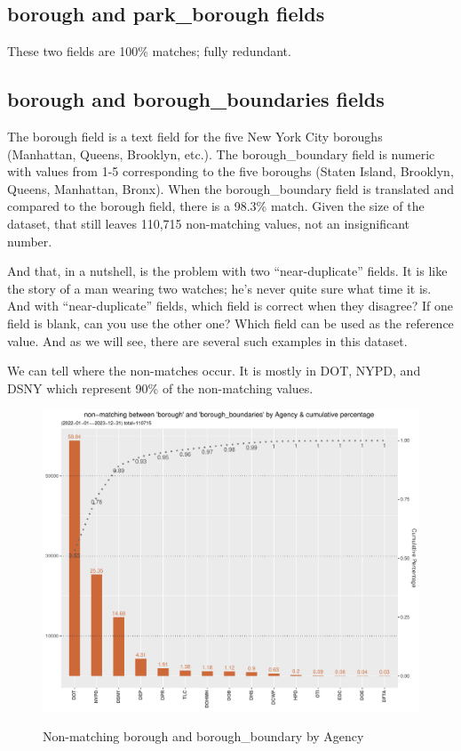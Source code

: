 \documentclass[12pt, titlepage]{article}
\begin{document}
{\subsection{borough and park\_borough fields}  These two fields are 100\% matches; fully redundant.

\subsection{borough and borough\_boundaries fields}  The borough field is a text field for the five New York City boroughs (Manhattan, Queens, Brooklyn, etc.).
The borough\_boundary field is numeric with values from 1-5 corresponding to the five boroughs (Staten Island, Brooklyn, Queens, Manhattan, Bronx).
When the borough\_boundary field is translated and compared to the borough field, there is a 98.3\% match. Given the size of the dataset, that 
still leaves 110,715 non-matching values, not an insignificant number.  

And that, in a nutshell, is the problem with two ``near-duplicate'' fields. It is like the  story of a man wearing two watches; he's never
quite sure what time it is. And with ``near-duplicate'' fields, which field is correct when they disagree? 
If one field is blank, can you use the other one? Which field can be used as the reference value.
 And as we will see, there are several such examples in this dataset.

We can tell where the non-matches occur. It is mostly in DOT, NYPD, and DSNY which represent 90\% of the non-matching values.

	\begin{figure}[tbp]
		 \centering
		  \caption{Non-matching borough and borough\_boundary by Agency }
		 \includegraphics[width = \textwidth]{non_matching_borough_boundaries_chart.pdf}
		 \label{fig:borough-boundaries}
	\end{figure}	
	
}
\end{document}
